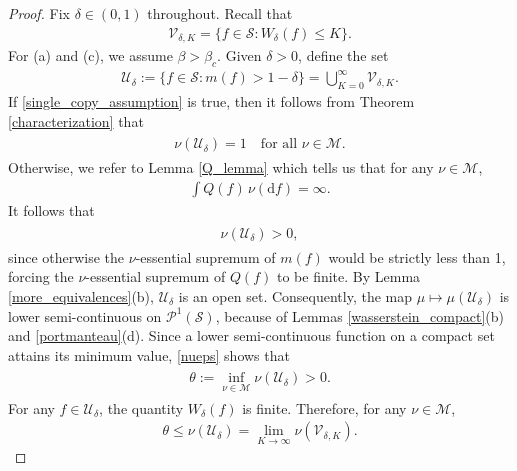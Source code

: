 \documentclass[11pt,reqno]{amsart}
\numberwithin{equation}{section}
\theoremstyle{definition}
\begin{document}
\begin{proof}
Fix $\delta\in (0,1)$ throughout. 
Recall that
{\begin{align*} {
{\mathcal{V}}_{\delta,K} = \{f \in {\mathcal{S}} : W_\delta(f) \leq K\}.
} \end{align*}}
For (a) and (c), we assume $\beta > \beta_c$.
Given $\delta > 0$, define the set
{\begin{align*} {
{\mathcal{U}}_\delta := \{f\in {\mathcal{S}}: m(f) > 1-\delta\} = \bigcup_{K = 0}^\infty {\mathcal{V}}_{\delta,K}.
} \end{align*}}
If \eqref{single_copy_assumption} is true, then it follows from Theorem \ref{characterization} that
{\begin{align} \begin{split} {
\nu({\mathcal{U}}_\delta) = 1 \quad \text{for all $\nu \in {\mathcal{M}}$.} \label{theta1}
} \end{split} \end{align}} 
Otherwise, we refer to Lemma \ref{Q_lemma} which tells us that for any $\nu\in  {\mathcal{M}}$,
{\begin{align*} {
\int Q(f)\, \nu({\mathrm{d}} f) =\infty.
} \end{align*}}
It follows that
{\begin{align} \begin{split} {
\nu({\mathcal{U}}_\delta) > 0,\label{nueps}
} \end{split} \end{align}}
since otherwise the $\nu$-essential supremum of $m(f)$ would be strictly less than 1, forcing the $\nu$-essential supremum of $Q(f)$ to be finite.
By Lemma \ref{more_equivalences}(b), ${\mathcal{U}}_\delta$ is an open set. Consequently, the map $\mu \mapsto \mu({\mathcal{U}}_\delta)$ is lower semi-continuous on ${\mathcal{P}}^1({\mathcal{S}})$, because of Lemmas \ref{wasserstein_compact}(b) and \ref{portmanteau}(d).
Since a lower semi-continuous function on a compact set attains its minimum value, \eqref{nueps} shows that
{\begin{align} \begin{split} {
\theta:= \inf_{\nu\in{\mathcal{M}}} \nu({\mathcal{U}}_\delta) > 0.\label{nueps2}
} \end{split} \end{align}}
For any $f \in {\mathcal{U}}_\delta$, the quantity $W_\delta(f)$ is finite.
Therefore, for any $\nu \in {\mathcal{M}}$,
{\begin{align*} {
\theta \leq \nu({\mathcal{U}}_\delta) = \lim_{K \to \infty} \nu({\mathcal{V}}_{\delta,K}).
} \end{align*}}

\end{proof}
\end{document}
